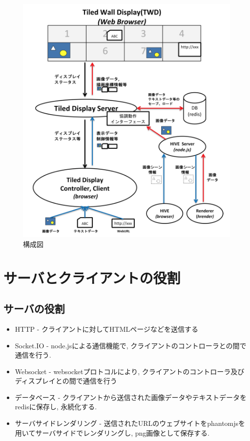 \documentclass[a4paper,10pt,oneside]{jsbook}
\begin{document}
\begin{figure}[htbp]
	\begin{center}
		\includegraphics[width=11.5cm]{image/system.png}
	\end{center}
	\caption{構成図}
	\label{fig:system}
\end{figure}

\section{サーバとクライアントの役割}

\subsection{サーバの役割}
\begin{itemize}
\item HTTP - クライアントに対してHTMLページなどを送信する
\item Socket.IO - node.jsによる通信機能で, クライアントのコントローラとの間で通信を行う.
\item Websocket - websocketプロトコルにより, クライアントのコントローラ及びディスプレイとの間で通信を行う
\item データベース - クライアントから送信された画像データやテキストデータをredisに保存し, 永続化する.
\item サーバサイドレンダリング - 送信されたURLのウェブサイトをphantomjsを用いてサーバサイドでレンダリングし, png画像として保存する.
\end{itemize}
\end{document}
